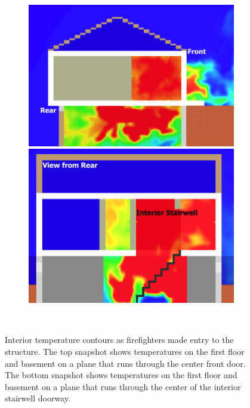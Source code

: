 \documentclass[12pt,oneside]{book}
\begin{document}
\begin{figure}[!ht]
\begin{subfigure}{0.65\textwidth}
\includegraphics[trim = 0in 0in 0in 0in, clip=true, width=\textwidth]{../Figures/side_view_142s} \\
\vskip4pt
\includegraphics[trim = 0in 0in 0in 0in, clip=true, width=\textwidth]{../Figures/stair_view_142s} 
\end{subfigure}
\begin{subfigure}{0.35\textwidth}

 \\
\end{subfigure}
\caption[Interior temperature contours as firefighters made entry to the structure]
{Interior temperature contours as firefighters made entry to the structure. The top snapshot shows temperatures on the first floor and basement on a plane that runs through the center front door. The bottom snapshot shows temperatures on the first floor and basement on a plane that runs through the center of the interior stairwell doorway.}
\label{fig:int_temp_142s}
\end{figure}
\end{document}
